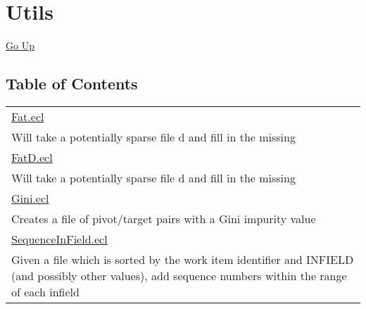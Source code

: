 \chapter*{\color{headtoc} Utils}
\hypertarget{ecldoc:toc:root/ML_Core/Utils}{}
\hyperlink{ecldoc:toc:root/ML_Core}{Go Up}


\section*{Table of Contents}
{\renewcommand{\arraystretch}{1.5}
\begin{longtable}{|p{\textwidth}|}
\hline
\hyperlink{ecldoc:toc:ML_Core.Utils.Fat}{Fat.ecl} \\
Will take a potentially sparse file d and fill in the missing \\
\hline
\hyperlink{ecldoc:toc:ML_Core.Utils.FatD}{FatD.ecl} \\
Will take a potentially sparse file d and fill in the missing \\
\hline
\hyperlink{ecldoc:toc:ML_Core.Utils.Gini}{Gini.ecl} \\
Creates a file of pivot/target pairs with a Gini impurity value \\
\hline
\hyperlink{ecldoc:toc:ML_Core.Utils.SequenceInField}{SequenceInField.ecl} \\
Given a file which is sorted by the work item identifier and INFIELD (and possibly other values), add sequence numbers within the range of each infield \\
\hline
\end{longtable}
}





